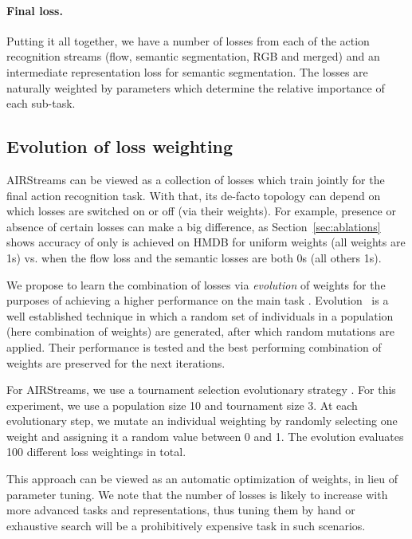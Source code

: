 \documentclass[final]{cvpr}
\begin{document}
\paragraph{Final loss.}
Putting it all together, we have a number of losses from each of the action recognition streams (flow, semantic segmentation, RGB and merged) and an intermediate representation loss for semantic segmentation. The losses are naturally weighted by parameters  which determine the relative importance of each sub-task.


\subsection{Evolution of loss weighting}
\label{sec:evo}

AIRStreams can be viewed as a collection of losses which train jointly for the final action recognition task. With that, its de-facto topology can depend on which losses are switched on or off (via their weights). 
For example, presence or absence of certain losses can make a big difference, as Section~\ref{sec:ablations} shows accuracy of only  is achieved on HMDB for uniform weights (all weights are 1s) vs.  when the flow loss and the semantic losses are both 0s (all others 1s).

We propose to learn the combination of losses via {\it evolution} of weights for the purposes of achieving a higher performance on the main task \cite{piergiovanni2020evolving}.
Evolution~\cite{goldberg91acomparative,real2019amoeba} is a well established technique in which a random set of individuals in a population (here combination of weights) are generated, after which random mutations are applied. Their performance is tested and the best performing combination of weights are preserved for the next iterations.

For AIRStreams, we use a tournament selection evolutionary strategy \cite{goldberg91acomparative}. For this experiment, we use a population size 10 and tournament size 3. At each evolutionary step, we mutate an individual weighting by randomly selecting one weight and assigning it a random value between 0 and 1. The evolution evaluates 100 different loss weightings in total.

This approach can be viewed as an automatic optimization of weights, in lieu of parameter tuning. 
We note that the number of losses is likely to increase with more advanced tasks and representations, thus tuning them by hand or exhaustive search will be a prohibitively expensive task in such scenarios.
\end{document}
